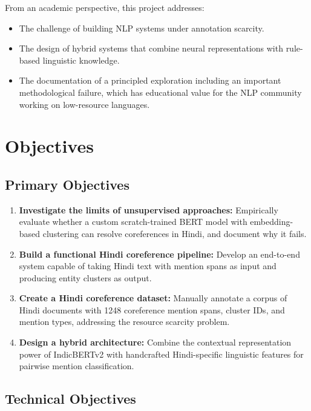 \documentclass[12pt,a4paper]{report}
\begin{document}
From an academic perspective, this project addresses:
\begin{itemize}
    \item The challenge of building NLP systems under annotation scarcity.
    \item The design of hybrid systems that combine neural representations with rule-based linguistic knowledge.
    \item The documentation of a principled exploration including an important methodological failure, which has educational value for the NLP community working on low-resource languages.
\end{itemize}

\section{Objectives}

\subsection{Primary Objectives}

\begin{enumerate}
    \item \textbf{Investigate the limits of unsupervised approaches:} Empirically evaluate whether a custom scratch-trained BERT model with embedding-based clustering can resolve coreferences in Hindi, and document why it fails.
    \item \textbf{Build a functional Hindi coreference pipeline:} Develop an end-to-end system capable of taking Hindi text with mention spans as input and producing entity clusters as output.
    \item \textbf{Create a Hindi coreference dataset:} Manually annotate a corpus of Hindi documents with 1248 coreference mention spans, cluster IDs, and mention types, addressing the resource scarcity problem.
    \item \textbf{Design a hybrid architecture:} Combine the contextual representation power of IndicBERTv2 with handcrafted Hindi-specific linguistic features for pairwise mention classification.
\end{enumerate}

\subsection{Technical Objectives}
\end{document}
